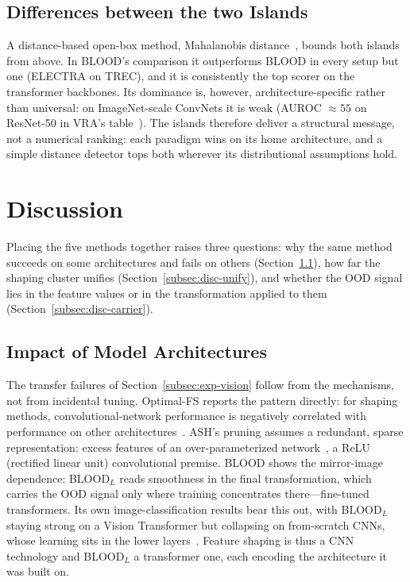 \documentclass[a4paper]{article}
\begin{document}
\subsection{Differences between the two Islands}
\label{subsec:exp-ceiling}

A distance-based open-box method, Mahalanobis distance~\citep{mahalanobis}, bounds both
islands from above. In BLOOD's comparison it outperforms BLOOD in every setup but one
(ELECTRA on TREC), and it is consistently the top scorer on the transformer
backbones. Its dominance is, however, architecture-specific rather than universal: on
ImageNet-scale ConvNets it is weak (AUROC $\approx 55$ on ResNet-50 in VRA's
table~\citep{vra}). The islands therefore deliver a structural message, not a numerical ranking:
each paradigm wins on its home architecture, and a simple distance detector tops both
wherever its distributional assumptions hold.

\section{Discussion}
\label{sec:discussion}

Placing the five methods together raises three questions: why the same method succeeds
on some architectures and fails on others (Section~\ref{subsec:disc-arch}), how far the
shaping cluster unifies (Section~\ref{subsec:disc-unify}), and whether the OOD signal
lies in the feature values or in the transformation applied to them
(Section~\ref{subsec:disc-carrier}).

\subsection{Impact of Model Architectures}
\label{subsec:disc-arch}

The transfer failures of Section~\ref{subsec:exp-vision} follow from the mechanisms,
not from incidental tuning. Optimal-FS reports the pattern directly: for shaping
methods, convolutional-network performance is negatively correlated with performance on
other architectures~\citep{optimalfs}. ASH's pruning assumes a redundant, sparse
representation: excess features of an over-parameterized network~\citep{ash}, a ReLU
(rectified linear unit) convolutional premise. BLOOD shows the mirror-image dependence:
BLOOD$_L$ reads smoothness in the final transformation, which carries the OOD signal
only where training concentrates there---fine-tuned transformers. Its own
image-classification results bear this out, with BLOOD$_L$ staying strong on a Vision
Transformer but collapsing on from-scratch CNNs, whose learning sits in the lower
layers~\citep{blood}. Feature shaping is thus a CNN technology and BLOOD$_L$ a
transformer one, each encoding the architecture it was built on.
\end{document}
